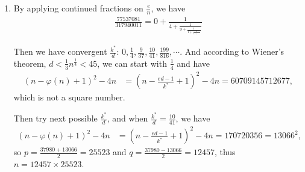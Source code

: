 \documentclass[11pt,a4paper]{article}
\begin{document}
\begin{enumerate}
\item By applying continued fractions on $\frac{e}{n}$, we have
\begin{align*}
	\frac{77537081}{317940011} = 0 + \frac{1}{4 + \frac{1}{9 + \frac{1}{1 + \frac{1}{19 + \cdots}}}}
\end{align*}
\par Then we have convergent $\frac{k^{*}}{d}$: $0, \frac{1}{4}, \frac{9}{37}, \frac{10}{41}, \frac{199}{816},\cdots$. And according to Wiener's theorem, $d < \frac{1}{3}n^{\frac{1}{4}} < 45$, we can start with $\frac{1}{4}$ and have
\begin{align*}
	(n - \varphi(n) + 1)^{2} - 4n &= (n - \frac{ed - 1}{k^{*}} + 1)^{2} - 4n = 60709145712677,
\end{align*}
which is not a square number.
\par Then try next possible $\frac{k^{*}}{d}$, and when $\frac{k^{*}}{d} = \frac{10}{41}$, we have
\begin{align*}
	(n - \varphi(n) + 1)^{2} - 4n &= (n - \frac{ed - 1}{k^{*}} + 1)^{2} - 4n = 170720356 = 13066^{2},
\end{align*}
so $p = \frac{37980 + 13066}{2} = 25523$ and $q = \frac{37980 - 13066}{2} = 12457$, thus $n = 12457 \times 25523$.
\end{enumerate}
\end{document}
